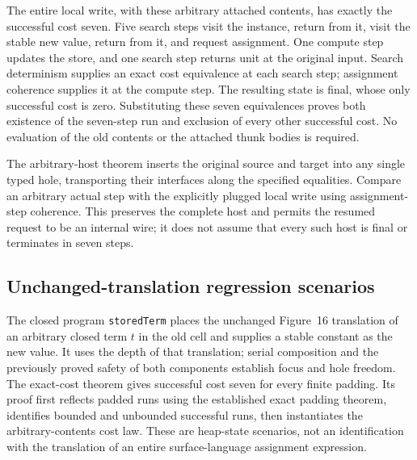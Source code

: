 

The entire local write, with these arbitrary attached contents, has exactly
the successful cost seven. Five search steps visit the instance, return from
it, visit the stable new value, return from it, and request assignment.
One compute step updates the store, and one search step returns unit at the
original input. Search determinism supplies an exact cost equivalence at
each search step; assignment coherence supplies it at the compute step.
The resulting state is final, whose only successful cost is zero.
Substituting these seven equivalences proves both existence of the seven-step
run and exclusion of every other successful cost. No evaluation of the old
contents or the attached thunk bodies is required.


The arbitrary-host theorem inserts the original source and target into any
single typed hole, transporting their interfaces along the specified
equalities. Compare an arbitrary actual step with the explicitly plugged
local write using assignment-step coherence. This preserves the complete
host and permits the resumed request to be an internal wire; it does not
assume that every such host is final or terminates in seven steps.


\subsection{Unchanged-translation regression scenarios}

The closed program \texttt{storedTerm} places the unchanged Figure~16
translation of an arbitrary closed term $t$ in the old cell and supplies a
stable constant as the new value. It uses the depth of that translation;
serial composition and the previously proved safety of both components
establish focus and hole freedom. The exact-cost theorem gives successful
cost seven for every finite padding. Its proof first reflects padded runs
using the established exact padding theorem, identifies bounded and unbounded
successful runs, then instantiates the arbitrary-contents cost law.
These are heap-state scenarios, not an identification with the translation
of an entire surface-language assignment expression.

